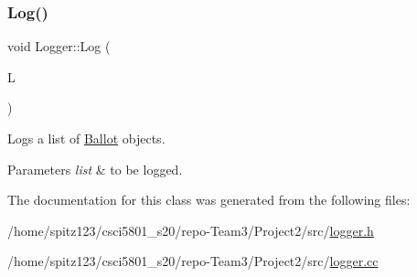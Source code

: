 \subsubsection{\texorpdfstring{Log()}{Log()}\hspace{0.1cm}{\footnotesize\ttfamily [4/4]}}
{\footnotesize\ttfamily void Logger\+::\+Log (\begin{DoxyParamCaption}\item[{std\+::list$<$ \hyperlink{classBallot}{Ballot} $\ast$$>$}]{L }\end{DoxyParamCaption})}



Logs a list of \hyperlink{classBallot}{Ballot} objects. 


\begin{DoxyParams}{Parameters}
{\em list} & to be logged. \\
\hline
\end{DoxyParams}


The documentation for this class was generated from the following files\+:\begin{DoxyCompactItemize}
\item 
/home/spitz123/csci5801\+\_\+s20/repo-\/\+Team3/\+Project2/src/\hyperlink{logger_8h}{logger.\+h}\item 
/home/spitz123/csci5801\+\_\+s20/repo-\/\+Team3/\+Project2/src/\hyperlink{logger_8cc}{logger.\+cc}\end{DoxyCompactItemize}
